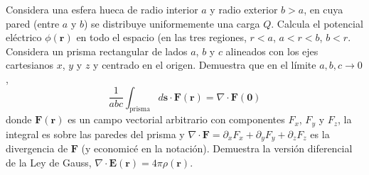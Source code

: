 \documentclass{exam}
\begin{document}
\begin{questions}
  \question Considera una esfera hueca de radio interior $a$ y radio
  exterior $b>a$, en cuya pared (entre $a$ y $b$) se distribuye
  uniformemente una carga $Q$. Calcula el potencial eléctrico
  $\phi(\bm r)$ en todo el espacio (en las tres regiones, $r<a$,
  $a<r<b$, $b<r$.
  \question Considera un prisma rectangular de lados $a$, $b$ y $c$
  alineados con los ejes cartesianos $x$, $y$ y $z$ y centrado en el
  origen. Demuestra que en el límite $a,b,c\to 0$,
  $$
  \frac{1}{abc}\int_{\mathrm{prisma}} d\bm s\cdot \bm F(\bm
  r)=\nabla\cdot \bm F(\bm 0)
  $$
  donde $\bm F(\bm r)$ es un campo vectorial arbitrario con
  componentes $F_x$, $F_y$ y $F_z$, la integral
  es sobre las paredes del prisma y $\nabla\cdot\bm F=\partial_x
  F_x+\partial_y F_y+\partial_z F_z$ es la divergencia de $\bm F$ (y
  economicé en la notación).
  \question Demuestra la versión diferencial de la Ley de Gauss,
  $\nabla\cdot \bm E(\bm r)=4\pi\rho(\bm r)$.
\end{questions}
\end{document}
